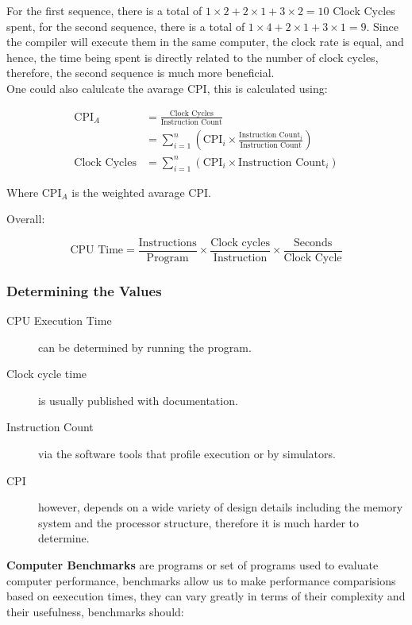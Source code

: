 \documentclass[11pt,a4paper,twocolumn]{book}
\begin{document}
For the first sequence, there is a total of $1 \times 2 + 2 \times 1 + 3 \times 2 = 10$ Clock Cycles spent, for the second sequence, there is a total of $1 \times 4 + 2 \times 1 + 3 \times 1 = 9$. Since the compiler will execute them in the same computer, the clock rate is equal, and hence, the time being spent is directly related to the number of clock cycles, therefore, the second sequence is much more beneficial.\\

One could also calulcate the avarage CPI, this is calculated using:

\begin{align}
\text{CPI}_A &= \frac{\text{Clock Cycles}}{\text{Instruction Count}}\\
&= \sum_{i = 1}^n \left( \text{CPI}_i \times \frac{\text{Instruction Count}_i}{\text{Instruction Count}}\right)\\
\text{Clock Cycles} &= \sum_{i =1}^n \left( \text{CPI}_i \times \text{Instruction Count}_i \right)
\end{align}

Where $\text{CPI}_A$ is the weighted avarage CPI.

Overall:

\begin{equation}
\text{CPU Time} = \frac{\text{Instructions}}{\text{Program}} \times \frac{\text{Clock cycles}}{\text{Instruction}} \times \frac{\text{Seconds}}{\text{Clock Cycle}}
\end{equation}

\subsubsection{Determining the Values}

\begin{description}
\item[CPU Execution Time] can be determined by running the program.
\item[Clock cycle time] is usually published with documentation.
\item[Instruction Count] via the software tools that profile execution or by simulators.
\item[CPI] however, depends on a wide variety of design details including the memory system and the processor structure, therefore it is much harder to determine.
\end{description}

\textbf{Computer Benchmarks} are programs or set of programs used to evaluate computer performance, benchmarks allow us to make performance comparisions based on eexecution times, they can vary greatly in terms of their complexity and their usefulness, benchmarks should:
\end{document}
